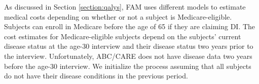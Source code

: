 \noindent As discussed in Section \ref{section:qalys}, FAM uses different models to estimate medical costs depending on whether or not a subject is Medicare-eligible. Subjects can enroll in Medicare before the age of 65 if they are claiming DI. The cost estimates for Medicare-eligible subjects depend on the subjects' current disease status at the age-30 interview and their disease status two years prior to the interview. Unfortunately, ABC/CARE does not have disease data two years before the age-30 interview. We initialize the process assuming that all subjects do not have their disease conditions in the previous period.










